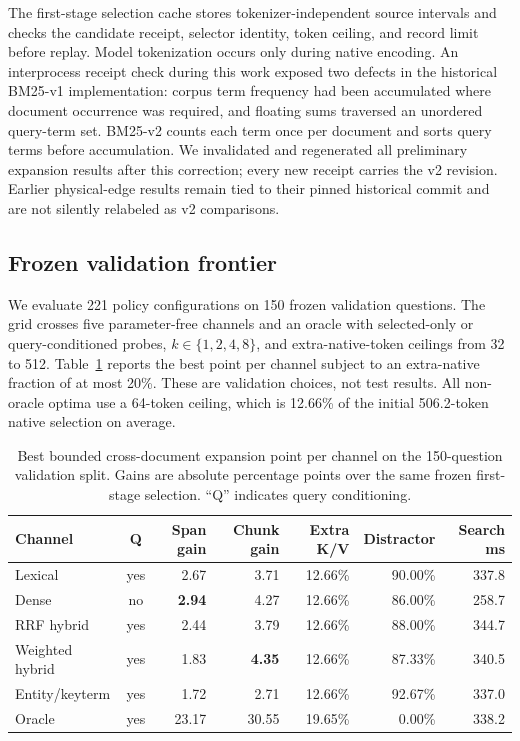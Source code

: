 \documentclass[11pt]{article}
\begin{document}
The first-stage selection cache stores tokenizer-independent source intervals
and checks the candidate receipt, selector identity, token ceiling, and record
limit before replay. Model tokenization occurs only during native encoding.
An interprocess receipt check during this work exposed two defects in the
historical BM25-v1 implementation: corpus term frequency had been accumulated
where document occurrence was required, and floating sums traversed an
unordered query-term set. BM25-v2 counts each term once per document and sorts
query terms before accumulation. We invalidated and regenerated all preliminary
expansion results after this correction; every new receipt carries the v2
revision. Earlier physical-edge results remain tied to their pinned historical
commit and are not silently relabeled as v2 comparisons.

\subsection{Frozen validation frontier}

We evaluate 221 policy configurations on 150 frozen validation questions. The
grid crosses five parameter-free channels and an oracle with selected-only or
query-conditioned probes, $k\in\{1,2,4,8\}$, and extra-native-token ceilings
from 32 to 512. Table~\ref{tab:expansion-validation} reports the best point per
channel subject to an extra-native fraction of at most 20\%. These are
validation choices, not test results. All non-oracle optima use a 64-token
ceiling, which is 12.66\% of the initial 506.2-token native selection on
average.

\begin{table}[t]
\centering
\small
\caption{Best bounded cross-document expansion point per channel on the
150-question validation split. Gains are absolute percentage points over the
same frozen first-stage selection. ``Q'' indicates query conditioning.}
\label{tab:expansion-validation}
\begin{tabular}{lcrrrrr}
\toprule
Channel & Q & Span gain & Chunk gain & Extra K/V & Distractor & Search ms \\
\midrule
Lexical & yes & 2.67 & 3.71 & 12.66\% & 90.00\% & 337.8 \\
Dense & no & \textbf{2.94} & 4.27 & 12.66\% & 86.00\% & 258.7 \\
RRF hybrid & yes & 2.44 & 3.79 & 12.66\% & 88.00\% & 344.7 \\
Weighted hybrid & yes & 1.83 & \textbf{4.35} & 12.66\% & 87.33\% & 340.5 \\
Entity/keyterm & yes & 1.72 & 2.71 & 12.66\% & 92.67\% & 337.0 \\
Oracle & yes & 23.17 & 30.55 & 19.65\% & 0.00\% & 338.2 \\
\bottomrule
\end{tabular}
\end{table}
\end{document}
